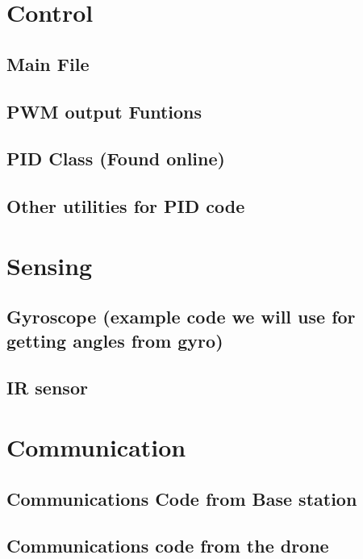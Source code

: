 \documentclass[a4paper,11pt]{article}
\begin{document}
\section{Control}
\subsection{Main File}
 
\subsection{PWM output Funtions}
 
 \subsection{PID Class (Found online)}
 
 \subsection{Other utilities for PID code}
 
\section{Sensing}
 \subsection{Gyroscope (example code we will use for getting angles from gyro)}
 
 \subsection{IR sensor}
 
\section{Communication}
\subsection{Communications Code from Base station}

\subsection{Communications code from the drone}

\end{document}
